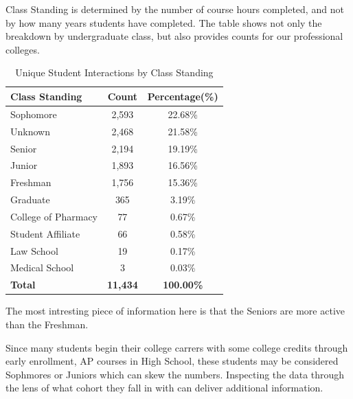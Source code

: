 \documentclass[
  letterpaper,
  DIV=11,
  numbers=noendperiod]{scrartcl}
\begin{document}
\noindent Class Standing is determined by the number of course hours
completed, and not by how many years students have completed. The table
shows not only the breakdown by undergraduate class, but also provides
counts for our professional colleges.

\begingroup\fontsize{10}{12}\selectfont

\begin{longtable}[t]{lcc}
\caption{\label{tab:Overall Class Standing Table}Unique Student Interactions by Class Standing}\\
\toprule
\textbf{Class Standing} & \textbf{Count} & \textbf{Percentage(\%)}\\
\midrule
Sophomore & 2,593 & 22.68\%\\
Unknown & 2,468 & 21.58\%\\
Senior & 2,194 & 19.19\%\\
Junior & 1,893 & 16.56\%\\
Freshman & 1,756 & 15.36\%\\
Graduate & 365 & 3.19\%\\
College of Pharmacy & 77 & 0.67\%\\
Student Affiliate & 66 & 0.58\%\\
Law School & 19 & 0.17\%\\
Medical School & 3 & 0.03\%\\
\midrule
\textbf{Total} & \textbf{11,434} & \textbf{100.00\%}\\
\bottomrule
\end{longtable}
\endgroup{}

The most intresting piece of information here is that the Seniors are
more active than the Freshman.

\noindent Since many students begin their college carrers with some
college credits through early enrollment, AP courses in High School,
these students may be considered Sophmores or Juniors which can skew the
numbers. Inspecting the data through the lens of what cohort they fall
in with can deliver additional information.

\begingroup\fontsize{10}{12}\selectfont
\end{document}
